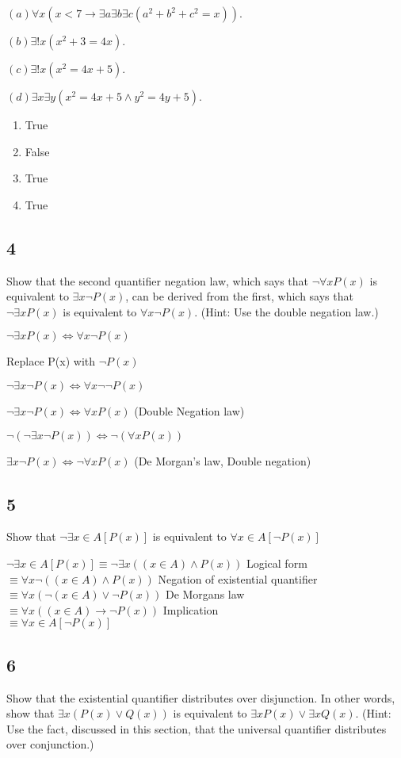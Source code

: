 \documentclass{article}
\begin{document}
$(a) \forall x(x < 7 \rightarrow \exists a \exists b \exists c(a^2+b^2+c^2 = x)).$

$(b) \exists! x(x^2+ 3 = 4x).$

$(c) \exists! x(x^2= 4x + 5).$

$(d) \exists x \exists y(x^2 = 4x + 5 \land y^2 = 4y + 5).$
\begin{enumerate}[label=(\alph*)]
    \item 
    True 
    \item
    False
    \item
    True
    \item
    True
\end{enumerate}
\subsection{4}
Show that the second quantifier negation law, which says that
$\neg \forall xP(x)$ is equivalent to $\exists x\neg P(x)$, can be derived from the first,
which says that $\neg \exists xP(x)$ is equivalent to $\forall x\neg P(x)$. (Hint: Use the
double negation law.)


$\neg \exists xP(x) \Leftrightarrow \forall x\neg P(x)$

Replace P(x) with $\neg P(x)$

$\neg \exists x \neg P(x) \Leftrightarrow \forall x\neg \neg P(x)$

$\neg \exists x \neg P(x) \Leftrightarrow \forall x P(x)$ (Double Negation law)

$\neg (\neg \exists x \neg P(x)) \Leftrightarrow \neg  (\forall x P(x))$

$\exists x \neg P(x) \Leftrightarrow \neg \forall x P(x)$ (De Morgan's law, Double negation)
\subsection{5}
Show that $\neg \exists x \in A [P(x)]$ is equivalent to $\forall x \in A [\neg P(x)]$

$\neg \exists x \in A [P(x)] \equiv \neg \exists x((x \in A )\land P(x))$ Logical form
\\
$\equiv \forall x \neg((x \in A)\land P(x))$ Negation of existential quantifier
\\
$\equiv \forall x(\neg (x \in A)\lor \neg P(x))$ De Morgans law
\\
$\equiv \forall x((x \in A)\rightarrow \neg P(x))$ Implication
\\
$\equiv \forall x \in A [\neg P(x)]$ 
\subsection{6}
Show that the existential quantifier distributes over disjunction. In
other words, show that $\exists x(P(x) \lor Q(x))$ is equivalent to $\exists xP(x) \lor
\exists xQ(x)$. (Hint: Use the fact, discussed in this section, that the
universal quantifier distributes over conjunction.)
\end{document}
